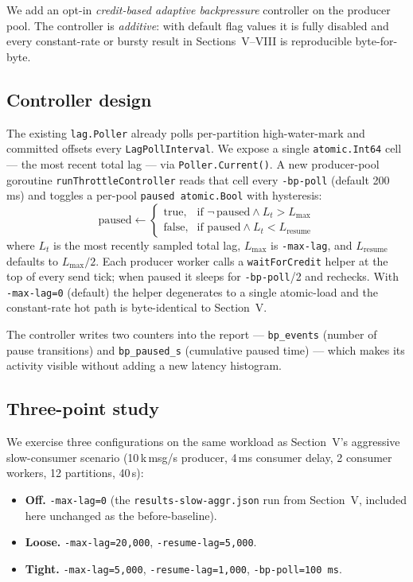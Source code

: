 \documentclass[conference]{IEEEtran}
\begin{document}
We add an opt-in \emph{credit-based adaptive backpressure} controller
on the producer pool. The controller is \emph{additive}: with default
flag values it is fully disabled and every constant-rate or bursty
result in Sections~V--VIII is reproducible byte-for-byte.

\subsection{Controller design}
The existing \texttt{lag.Poller} already polls per-partition
high-water-mark and committed offsets every \texttt{LagPollInterval}.
We expose a single \texttt{atomic.Int64} cell --- the most recent
total lag --- via \texttt{Poller.Current()}. A new producer-pool
goroutine \texttt{runThrottleController} reads that cell every
\texttt{-bp-poll} (default 200\,ms) and toggles a per-pool
\texttt{paused atomic.Bool} with hysteresis:
\begin{equation*}
\mathrm{paused} \leftarrow
\begin{cases}
\text{true},  & \text{if } \neg\,\mathrm{paused} \wedge L_t > L_{\max} \\
\text{false}, & \text{if } \mathrm{paused} \wedge L_t < L_{\mathrm{resume}}
\end{cases}
\end{equation*}
where $L_t$ is the most recently sampled total lag, $L_{\max}$ is
\texttt{-max-lag}, and $L_{\mathrm{resume}}$ defaults to
$L_{\max}/2$. Each producer worker calls a \texttt{waitForCredit}
helper at the top of every send tick; when paused it sleeps for
\texttt{-bp-poll}/2 and rechecks. With \texttt{-max-lag=0} (default)
the helper degenerates to a single atomic-load and the
constant-rate hot path is byte-identical to Section~V.

The controller writes two counters into the report ---
\texttt{bp\_events} (number of pause transitions) and
\texttt{bp\_paused\_s} (cumulative paused time) --- which makes
its activity visible without adding a new latency histogram.

\subsection{Three-point study}
We exercise three configurations on the same workload as
Section~V's aggressive slow-consumer scenario (10\,k\,msg/s producer,
4\,ms consumer delay, 2 consumer workers, 12 partitions, 40\,s):

\begin{itemize}
\item \textbf{Off.} \texttt{-max-lag=0} (the
  \texttt{results-slow-aggr.json} run from Section~V, included here
  unchanged as the before-baseline).
\item \textbf{Loose.} \texttt{-max-lag=20{,}000},
  \texttt{-resume-lag=5{,}000}.
\item \textbf{Tight.} \texttt{-max-lag=5{,}000},
  \texttt{-resume-lag=1{,}000}, \texttt{-bp-poll=100\,ms}.
\end{itemize}
\end{document}
